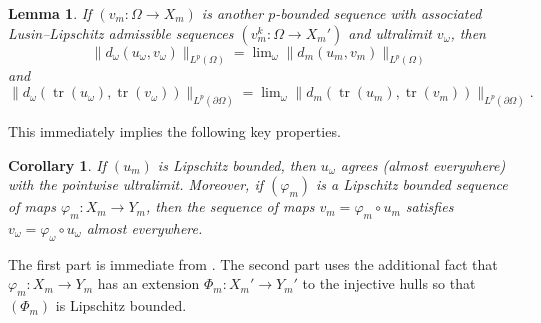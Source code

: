 \documentclass[a4paper,leqno]{amsart}
\numberwithin{equation}{section}
\newtheorem{corollary}[theorem]{Corollary}
\newtheorem{lemma}[theorem]{Lemma}
\theoremstyle{remark}
\theoremstyle{remark}
\DeclareMathOperator{\trace}{tr}
\begin{document}
\begin{lemma}\label{lemma-control-on-the-Lp-norms}
    If $(v_m \colon \Omega \to X_m )$ is another $p$-bounded sequence with associated Lusin--Lipschitz admissible sequences $(v_m^k \colon \Omega \to X_m' )$ and ultralimit $v_\omega$, then $$\|d_\omega(u_\omega, v_\omega)\|_{L^p(\Omega)} = \lim\nolimits_\omega \|d_m(u_m, v_m)\|_{L^p(\Omega)}$$ and $$\|d_\omega(\trace(u_\omega),\trace(v_\omega))\|_{L^{p}(\partial \Omega)} = \lim\nolimits_\omega \|d_m( \trace(u_m), \trace(v_m) )\|_{L^{p}(\partial \Omega)}.$$ 
\end{lemma}


This immediately implies the following key properties.
\begin{corollary}
    If $(u_m)$ is Lipschitz bounded, then $u_\omega$ agrees (almost everywhere) with the pointwise ultralimit. Moreover, if $(\varphi_m)$ is a Lipschitz bounded sequence of maps $\varphi_m\colon X_m\to Y_m$, then the sequence of maps $v_m = \varphi_m\circ u_m$ satisfies $v_\omega=\varphi_\omega\circ u_\omega$ almost everywhere.
\end{corollary}
The first part is immediate from . The second part uses the additional fact that $\varphi_m \colon X_m \to Y_m$ has an extension $\Phi_m \colon X_{m}' \to Y_m'$ to the injective hulls so that $( \Phi_m )$ is Lipschitz bounded.
\end{document}
